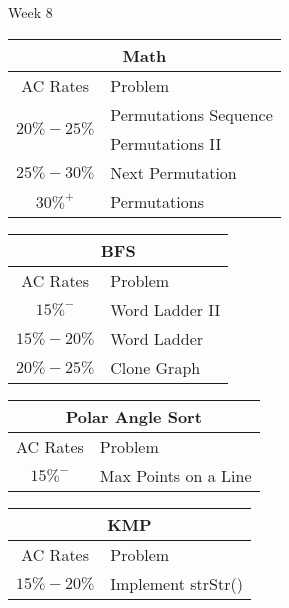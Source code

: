 \documentclass[paper=a4, fontsize=11pt]{scrartcl} %
\begin{document}
\begin{center}
  \pagebreak

  \begin{center}
    Week 8
  \end{center}

  \begin{tabular}{|c|l|}
      \hline
      \multicolumn{2}{|c|}{Math} \\
      \hline
      AC Rates      &   Problem     \\
      \hline
      \multirow{2}{*}{$20\%-25\%$}  &    Permutations Sequence \\
          & Permutations II \\
      \hline
      \multirow{1}{*}{$25\%-30\%$}  &    Next Permutation \\
      \hline
      \multirow{1}{*}{$30\%^+$}  & Permutations    \\
      \hline
  \end{tabular}

  \vspace{10mm}

  \begin{tabular}{|c|l|}
      \hline
      \multicolumn{2}{|c|}{BFS} \\
      \hline
      AC Rates      &   Problem     \\
      \hline
      \multirow{1}{*}{$15\%^-$}  &    Word Ladder II   \\
      \hline
      \multirow{1}{*}{$15\%-20\%$}  &    Word Ladder    \\
      \hline
      \multirow{1}{*}{$20\%-25\%$}  &    Clone Graph    \\
      \hline
  \end{tabular}

  \vspace{10mm}

  \begin{tabular}{|c|l|}
      \hline
      \multicolumn{2}{|c|}{Polar Angle Sort} \\
      \hline
      AC Rates      &   Problem     \\
      \hline
      \multirow{1}{*}{$15\%^-$}  &    Max Points on a Line    \\
      \hline
  \end{tabular}

  \vspace{10mm}

  \begin{tabular}{|c|l|}
      \hline
      \multicolumn{2}{|c|}{KMP} \\
      \hline
      AC Rates      &   Problem     \\
      \hline
      \multirow{1}{*}{$15\%-20\%$}  &    Implement strStr() \\
      \hline
  \end{tabular}
\end{center}
\end{document}
